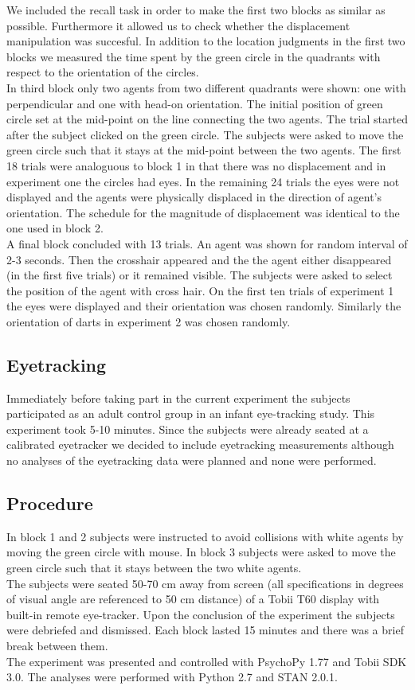 \documentclass[10pt]{article}
\begin{document}
We included the recall task in order to make the first two blocks as similar as possible. 
Furthermore it allowed us to check whether the displacement manipulation was succesful.
In addition to the location judgments in the first two blocks we measured the time spent by the green circle in the quadrants with respect to the orientation of the circles.\\
In third block only two agents from two different quadrants were shown: one with perpendicular and one with head-on orientation. 
The initial position of green circle set at the mid-point on the line connecting the two agents. 
The trial started after the subject clicked on the green circle. 
The subjects were asked to move the green circle such that it stays at the mid-point between the two agents. 
The first 18 trials were analoguous to block 1 in that there was no displacement and in experiment one the circles had eyes. 
In the remaining 24 trials the eyes were not displayed and the agents were physically displaced in the direction of agent's orientation. 
The schedule for the magnitude of displacement was identical to the one used in block 2.\\
A final block concluded with 13 trials. 
An agent was shown for random interval of 2-3 seconds. 
Then the crosshair appeared and the the agent either disappeared (in the first five trials) or it remained visible. 
The subjects were asked to select the position of the agent with cross hair. 
On the first ten trials of experiment 1 the eyes were displayed and their orientation was chosen randomly. 
Similarly the orientation of darts in experiment 2 was chosen randomly.\\
 
\subsection*{Eyetracking}
Immediately before taking part in the current experiment the subjects participated as an adult control group in an infant eye-tracking study. 
This experiment took 5-10 minutes. 
Since the subjects were already seated at a calibrated eyetracker we decided to include eyetracking measurements although no analyses of the eyetracking data were planned and none were performed.

\subsection*{Procedure}
In block 1 and 2 subjects were instructed to avoid collisions with white agents by moving the green circle with mouse. 
In block 3 subjects were asked to move the green circle such that it stays between the two white agents. \\
The subjects were seated 50-70 cm away from screen (all specifications in degrees of visual angle are referenced to 50 cm distance) of a Tobii T60 display with built-in remote eye-tracker. 
Upon the conclusion of the experiment the subjects were debriefed and dismissed. 
Each block lasted 15 minutes and there was a brief break between them.\\
The experiment was presented and controlled with PsychoPy 1.77 \cite{peirce07} and Tobii SDK 3.0. 
The analyses were performed with Python 2.7 and STAN 2.0.1.
\end{document}
